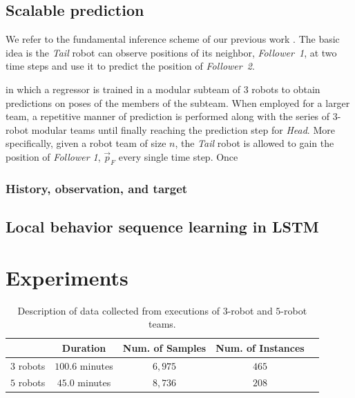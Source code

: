 \documentclass[letterpaper, 10 pt, conference]{ieeeconf}  %
\begin{document}
	\subsection{Scalable prediction} 
	\label{sec:scalable_prediction}
	
	We refer to the fundamental inference scheme of our previous work \cite{CPR17}. 
	The basic idea is the \emph{Tail} robot can observe positions of its neighbor, 
	\emph{Follower~1}, at two time steps and use it to predict the position of 
	\emph{Follower~2}. 
	
	 in which 
	a regressor is trained in a modular subteam of $3$ robots to obtain predictions 
	on poses of the members of the subteam. 
	When employed for a larger team, a repetitive manner of prediction is performed 
	along with the series of $3$-robot modular teams until finally reaching the prediction 
	step for \emph{Head}. 
	More specifically, given a robot team of size $n$, the \emph{Tail} robot 
	is allowed to gain the position of \emph{Follower 1}, $\vec{p}_{F}$ every 
	single time step. Once 
	
	\subsubsection{History, observation, and target}
	
	
	\subsection{Local behavior sequence learning in LSTM}
	\label{sec:local_behavior_sequence_learning_in_lstm}
	 
	
	
	\section{Experiments} 
	\label{sec:experiments} 
	
	
	\begin{table}[t]
		\label{table:data_description}
		\centering
		\begin{tabular}{|c|c|c|c|c|}
			\hline
						&  Duration & Num. of Samples & Num. of Instances  \\ \hline
			$3$ robots & $100.6$ minutes & $6,975$ & $465$  \\ \hline
			$5$ robots & $45.0$ minutes  & $8,736$ & $208$  \\ \hline
		\end{tabular}
		\caption{Description of data collected from executions of $3$-robot and $5$-robot teams.}
	\end{table}
	
\end{document}
